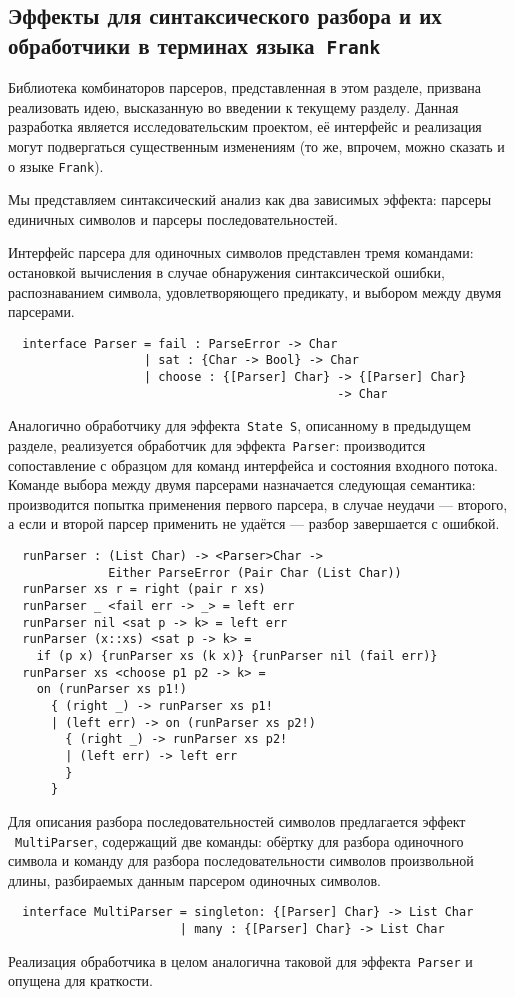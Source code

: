 \documentclass [a4paper] {article}
\begin{document}
\subsection{Эффекты для синтаксического разбора и их обработчики
            в терминах языка~\texttt{Frank}}

Библиотека комбинаторов парсеров, представленная в этом разделе, призвана реализовать идею, высказанную во введении к текущему разделу. Данная разработка является
исследовательским проектом, её интерфейс и реализация могут подвергаться существенным изменениям (то же, впрочем, можно сказать и о языке \texttt{Frank}).

Мы представляем синтаксический анализ
как два зависимых эффекта: парсеры единичных символов и парсеры
последовательностей.

Интерфейс парсера для одиночных символов представлен тремя командами: остановкой
вычисления в случае обнаружения синтаксической ошибки, распознаванием символа,
удовлетворяющего предикату, и выбором между двумя парсерами.
\begin{verbatim}
  interface Parser = fail : ParseError -> Char
                   | sat : {Char -> Bool} -> Char
                   | choose : {[Parser] Char} -> {[Parser] Char}
                                              -> Char
\end{verbatim}

Аналогично обработчику для эффекта~\texttt{State S}, описанному в предыдущем
разделе, реализуется обработчик для эффекта~\texttt{Parser}: производится
сопоставление с образцом для команд интерфейса и состояния входного потока.
Команде выбора между двумя парсерами назначается следующая семантика:
производится попытка применения первого парсера, в случае неудачи --- второго, а
если и второй парсер применить не удаётся --- разбор завершается с ошибкой.
\begin{verbatim}
  runParser : (List Char) -> <Parser>Char ->
              Either ParseError (Pair Char (List Char))
  runParser xs r = right (pair r xs)
  runParser _ <fail err -> _> = left err
  runParser nil <sat p -> k> = left err
  runParser (x::xs) <sat p -> k> =
    if (p x) {runParser xs (k x)} {runParser nil (fail err)}
  runParser xs <choose p1 p2 -> k> =
    on (runParser xs p1!)
      { (right _) -> runParser xs p1!
      | (left err) -> on (runParser xs p2!)
        { (right _) -> runParser xs p2!
        | (left err) -> left err
        }
      }
\end{verbatim}

Для описания разбора последовательностей символов предлагается эффект
~\texttt{MultiParser}, содержащий две команды: обёртку для разбора одиночного
символа и команду для разбора последовательности символов произвольной длины,
разбираемых данным парсером одиночных символов.
\begin{verbatim}
  interface MultiParser = singleton: {[Parser] Char} -> List Char
                        | many : {[Parser] Char} -> List Char
\end{verbatim}
Реализация обработчика в целом аналогична таковой для эффекта~\texttt{Parser}
и опущена для краткости.
\end{document}
